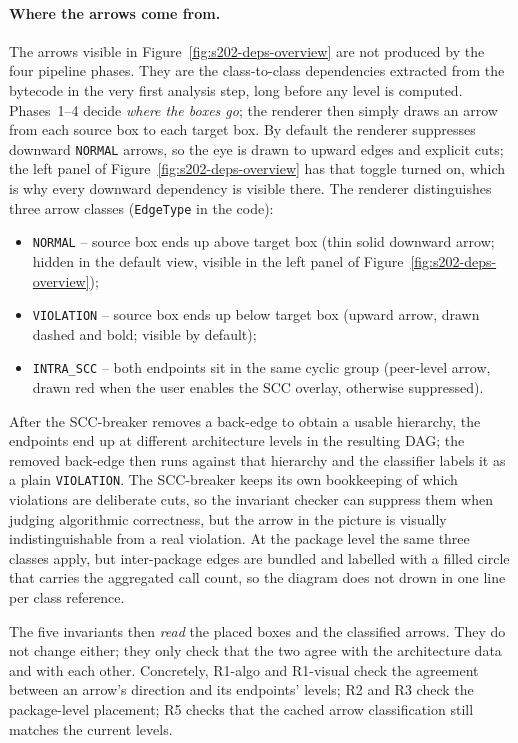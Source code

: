 \documentclass[a4paper,twoside]{article}
\begin{document}
\paragraph{Where the arrows come from.} The arrows visible in
Figure~\ref{fig:s202-deps-overview} are not produced by the four pipeline
phases. They are the class-to-class dependencies extracted from the
bytecode in the very first analysis step, long before any level is
computed. Phases~1--4 decide \emph{where the boxes go}; the renderer then
simply draws an arrow from each source box to each target box. By default
the renderer suppresses downward \texttt{NORMAL} arrows, so the eye is
drawn to upward edges and explicit cuts; the left panel of
Figure~\ref{fig:s202-deps-overview} has that toggle turned on, which is
why every downward dependency is visible there. The renderer distinguishes
three arrow classes (\texttt{EdgeType} in the code):
\begin{itemize}\setlength{\itemsep}{1pt}
  \item \texttt{NORMAL} -- source box ends up above target box (thin solid
        downward arrow; hidden in the default view, visible in the left
        panel of Figure~\ref{fig:s202-deps-overview});
  \item \texttt{VIOLATION} -- source box ends up below target box (upward
        arrow, drawn dashed and bold; visible by default);
  \item \texttt{INTRA\_SCC} -- both endpoints sit in the same cyclic group
        (peer-level arrow, drawn red when the user enables the SCC overlay,
        otherwise suppressed).
\end{itemize}
After the SCC-breaker removes a back-edge to obtain a usable hierarchy, the
endpoints end up at different architecture levels in the resulting DAG; the
removed back-edge then runs against that hierarchy and the classifier
labels it as a plain \texttt{VIOLATION}. The SCC-breaker keeps its own
bookkeeping of which violations are deliberate cuts, so the invariant
checker can suppress them when judging algorithmic correctness, but the
arrow in the picture is visually indistinguishable from a real violation.
At the package level the same three classes apply, but inter-package edges
are bundled and labelled with a filled circle that carries the aggregated
call count, so the diagram does not drown in one line per class reference.

The five invariants then \emph{read} the placed boxes and the classified
arrows. They do not change either; they only check that the two agree
with the architecture data and with each other. Concretely, R1-algo and
R1-visual check the agreement between an arrow's direction and its
endpoints' levels; R2 and R3 check the package-level placement; R5
checks that the cached arrow classification still matches the current
levels.
\end{document}
